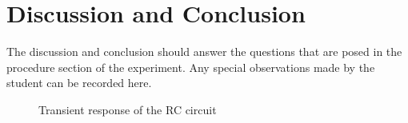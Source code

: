 \documentclass[12pt]{article}
\begin{document}
\section{Discussion and Conclusion}\label{sec:d_and_c}
The discussion and conclusion should answer the questions that are posed in the procedure section of the experiment. Any special observations made by the student can be recorded here.

\pagebreak

\begin{figure}
	\centering	
		 \quad
		 \quad
	\caption{Transient response of the RC circuit}
	\label{fig:rc_meas}
\end{figure}

\end{document}

